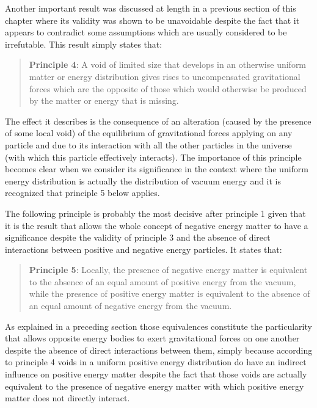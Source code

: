 \documentclass[notitlepage,12pt]{report}
\begin{document}
Another important result was discussed at length in a previous section of this chapter where its validity was shown to be unavoidable despite the fact that it appears to contradict some assumptions which are usually considered to be irrefutable. This result simply states that:
\begin{quote}
\textbf{Principle 4}: A void of limited size that develops in an otherwise uniform matter or energy distribution gives rises to uncompensated gravitational forces which are the opposite of those which would otherwise be produced by the matter or energy that is missing.
\end{quote}
The effect it describes is the consequence of an alteration (caused by the presence of some local void) of the equilibrium of gravitational forces applying on any particle and due to its interaction with all the other particles in the universe (with which this particle effectively interacts). The importance of this principle becomes clear when we consider its significance in the context where the uniform energy distribution is actually the distribution of vacuum energy and it is recognized that principle 5 below applies.

The following principle is probably the most decisive after principle 1 given that it is the result that allows the whole concept of negative energy matter to have a significance despite the validity of principle 3 and the absence of direct interactions between positive and negative energy particles. It states that:
\begin{quote}
\textbf{Principle 5}: Locally, the presence of negative energy matter is equivalent to the absence of an equal amount of positive energy from the vacuum, while the presence of positive energy matter is equivalent to the absence of an equal amount of negative energy from the vacuum.
\end{quote}
As explained in a preceding section those equivalences constitute the particularity that allows opposite energy bodies to exert gravitational forces on one another despite the absence of direct interactions between them, simply because according to principle 4 voids in a uniform positive energy distribution do have an indirect influence on positive energy matter despite the fact that those voids are actually equivalent to the presence of negative energy matter with which positive energy matter does not directly interact.
\end{document}

